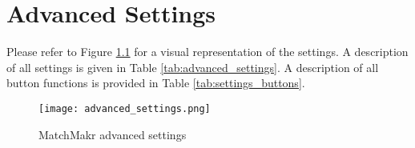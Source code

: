 \chapter{Advanced Settings}


\renewcommand{\arraystretch}{1}
\renewcommand{\pb}[1]{\parbox[t]{0.15\textwidth}{#1}}





%
%
Please refer to Figure \ref{fig:advanced_settings} for a visual representation of the settings.  A description of all settings is given in Table \ref{tab:advanced_settings}.  A description of all button functions is provided in Table \ref{tab:settings_buttons}.



%
%
\begin{figure}
	\centering
	\texttt{[image: advanced\_settings.png]}
	\caption{\label{fig:advanced_settings} MatchMakr advanced settings}
\end{figure}


